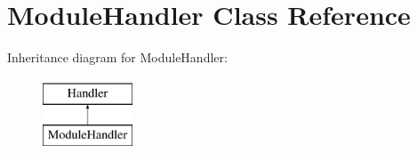 \hypertarget{classModuleHandler}{\section{Module\-Handler Class Reference}
\label{classModuleHandler}
}
Inheritance diagram for Module\-Handler\-:\begin{figure}[H]
\begin{center}
\leavevmode
\includegraphics[height=2.000000cm]{classModuleHandler}
\end{center}
\end{figure}
